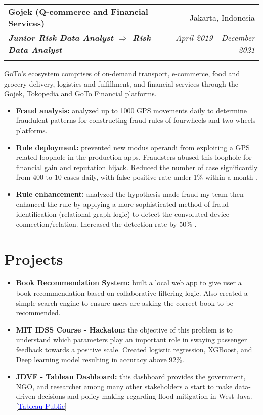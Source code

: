 \documentclass[a4paper, 11pt]{article}
\makeatletter
\newcommand{\resumeItem}[2]{
    \item\small{
        \textbf{#1}{#2 \vspace{-2pt}}
    }
}
\newcommand{\resumeSubheading}[4]{
    \vspace{-1pt}
    \begin{tabular*}{0.97\textwidth}{l@{\extracolsep{\fill}}r}
        \color{lightblue}\textbf{#1} & #2 \\
        \textbf{\textit{\small#3}} & \textit{\small #4} \\
        \textnormal{}\vspace{-5pt}
    \end{tabular*}\vspace{-5pt}
}
\newcommand{\resumeSubHeadingListEnd}{\end{itemize}}
\newcommand{\resumeItemListStart}{\begin{itemize}[leftmargin=*]\setlength\itemsep{0em}\vspace{-1pt}}
\newcommand{\resumeItemListEnd}{\end{itemize}\vspace{-5pt}}
\makeatother
\begin{document}
    \vspace{5pt}
    \resumeSubheading
    {Gojek (Q-commerce and Financial Services)}
    {Jakarta, Indonesia}
    {Junior Risk Data Analyst $\Rightarrow$ Risk Data Analyst}
    {April 2019 - December 2021}
    {GoTo’s ecosystem comprises of on-demand transport, e-commerce, food and grocery 
    delivery, logistics and fulfillment, and financial services through the Gojek, 
    Tokopedia and GoTo Financial platforms.}
    \vspace{-5pt}
    \resumeItemListStart
    \resumeItem{Fraud analysis:}{ analyzed up to 1000 GPS movements
    daily to determine fraudulent patterns for constructing fraud 
    rules of fourwheels and two-wheels platforms.}
    \resumeItem{Rule deployment:}{ prevented new modus operandi from exploiting a GPS 
    related-loophole in the production apps. Fraudsters abused this loophole for 
    financial gain and reputation hijack. Reduced the number of
    case significantly from 400 to 10 cases daily, with false positive rate under 1\%
    within a month}.
    \resumeItem{Rule enhancement:}{ analyzed the hypothesis made fraud my 
    team then enhanced the rule by applying a more sophisticated method of fraud 
    identification (relational graph logic) to detect the convoluted device 
    connection/relation. Increased the detection rate by 50\%}.
    \resumeItemListEnd


    \vspace{-20pt}
    \section{Projects}

    \resumeItemListStart
    \resumeItem{Book Recommendation System:}{ built a local web app to give user a book
    recommendation based on collaborative filtering logic. Also created a simple search
    engine to ensure users are asking the correct book to be recommended.
    \href{https://github.com/amrirasyidi/book_recommendation}\faGithub}
    \resumeItem{MIT IDSS Course - Hackaton:}{ the objective of this problem is to
    understand which parameters play an important role in swaying passenger feedback
    towards a positive scale. Created logistic regression, XGBoost, and Deep learning
    model resulting in accuracy above 92\%. 
    \href{https://github.com/amrirasyidi/mit_idss_hackaton}\faGithub}
    \resumeItem{JDVF - Tableau Dashboard:}{ this dashboard provides the government, NGO,
    and researcher among many other stakeholders a start to make data-driven decisions
    and policy-making regarding flood mitigation in West Java. 
    \href{https://public.tableau.com/app/profile/faisal.putra/viz/Book1_16671939458310/DashboardFINAL}{[\textcolor{blue}{Tableau Public}]}}
    \resumeItemListEnd
\end{document}
